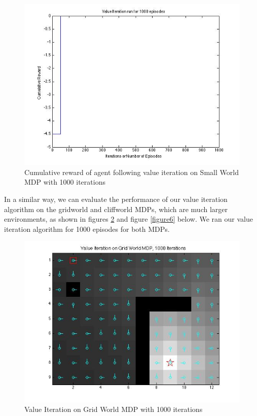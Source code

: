 \documentclass{article}\usepackage[]{graphicx}\usepackage[]{color}
\theoremstyle{plain}
\begin{document}
\begin{figure}[h!]
  \includegraphics[scale=0.5]{value1000_CumRwd.jpg}
  \caption{Cumulative reward of agent following value iteration on Small World MDP with 1000 iterations}
  \label{figure4}
\end{figure}

 
 


\noindent
In a similar way, we can evaluate the performance of our value iteration algorithm on the gridworld and cliffworld MDPs, which are much larger environments, as shown in figures \ref{figure5} and figure \ref{figure6} below. We ran our value iteration algorithm for 1000 episodes for both MDPs.\\



\begin{figure}[h!]
  \includegraphics[scale=0.5]{value1000_GridWorld.jpg}
  \caption{Value Iteration on Grid World MDP with 1000 iterations}
  \label{figure5}
\end{figure}
\end{document}
